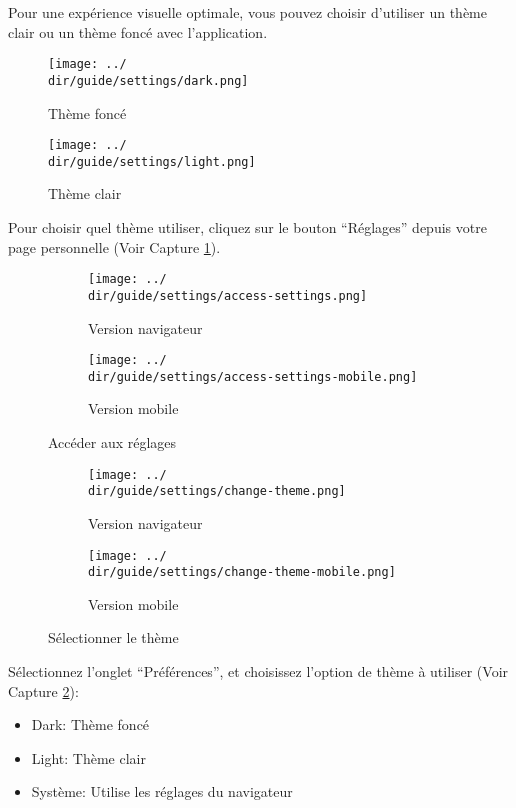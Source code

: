 Pour une expérience visuelle optimale, vous pouvez choisir d’utiliser un thème clair ou un thème foncé avec l’application.

\begin{multicols}{2}
\begin{figure}[H]
	\texttt{[image: ../\\dir/guide/settings/dark.png]}
	\caption{Thème foncé}
\end{figure}
\begin{figure}[H]
	\texttt{[image: ../\\dir/guide/settings/light.png]}
	\caption{Thème clair}
\end{figure}
\end{multicols}

Pour choisir quel thème utiliser, cliquez sur le bouton “Réglages” depuis votre page personnelle (Voir Capture \ref{fig:access-settings-theme}).

\begin{figure}[H]
	\begin{subfigure}[b]{0.7\textwidth}
		\texttt{[image: ../\\dir/guide/settings/access-settings.png]}
		\caption{Version navigateur}
	\end{subfigure}
	\begin{subfigure}[b]{0.25\textwidth}
		\texttt{[image: ../\\dir/guide/settings/access-settings-mobile.png]}
		\caption{Version mobile}
	\end{subfigure}
	\caption{Accéder aux réglages}
	\label{fig:access-settings-theme}
\end{figure}
\begin{figure}[H]
	\begin{subfigure}[b]{0.7\textwidth}
		\texttt{[image: ../\\dir/guide/settings/change-theme.png]}
		\caption{Version navigateur}
	\end{subfigure}
	\begin{subfigure}[b]{0.25\textwidth}
		\texttt{[image: ../\\dir/guide/settings/change-theme-mobile.png]}
		\caption{Version mobile}
	\end{subfigure}
	\caption{Sélectionner le thème}
	\label{fig:change-theme}
\end{figure}

Sélectionnez l’onglet “Préférences”, et choisissez l’option de thème à utiliser (Voir Capture \ref{fig:change-theme}):

\begin{itemize}
 	\item Dark: Thème foncé
 	\item Light: Thème clair
 	\item Système: Utilise les réglages du navigateur
\end{itemize}
